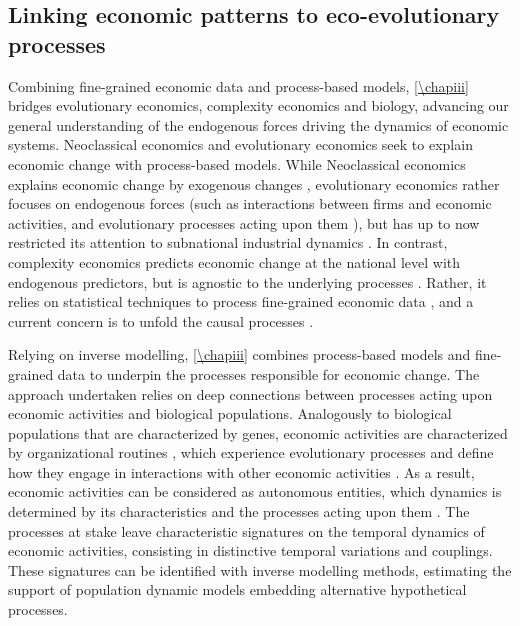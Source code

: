 \subsection{Linking economic patterns to eco-evolutionary processes}

Combining fine-grained economic data and process-based models, \cref{\chapiii} bridges evolutionary economics, complexity economics and biology, advancing our general understanding of the endogenous forces driving the dynamics of economic systems.
% 
Neoclassical economics and evolutionary economics seek to explain economic change with process-based models.
% 
While Neoclassical economics explains economic change by exogenous changes \citep{Boschma2005a}, evolutionary economics rather focuses on endogenous forces (such as interactions between firms and economic activities, and evolutionary processes acting upon them \citep{Metcalfe2006}), but has up to now restricted its attention to subnational industrial dynamics \citep{Hodgson2019}.
% 
In contrast, complexity economics \citep{Hidalgo2021} predicts economic change at the national level with endogenous predictors, but is agnostic to the underlying processes \citep{Hidalgo2021}. Rather, it relies on statistical techniques to process fine-grained economic data \citep{Mealy2019}, and a current concern is to unfold the causal processes \citep{Hidalgo2021}.


Relying on inverse modelling, \cref{\chapiii} combines process-based models and fine-grained data to underpin the processes responsible for economic change.
% 
The approach undertaken relies on deep connections between processes acting upon economic activities and biological populations.
% 
Analogously to biological populations that are characterized by genes, economic activities are characterized by organizational routines \citep{nelson1985evolutionary}, which experience evolutionary processes and define how they engage in interactions with other economic activities \citep{nelson1985evolutionary}.
% 
As a result, economic activities can be considered as autonomous entities, which dynamics is determined by its characteristics and the processes acting upon them \citep{Boschma2005a}.
% 
The processes at stake leave characteristic signatures on the temporal dynamics of economic activities, consisting in distinctive temporal variations and couplings.
% 
These signatures can be identified with inverse modelling methods, estimating the support of population dynamic models embedding alternative hypothetical processes.

